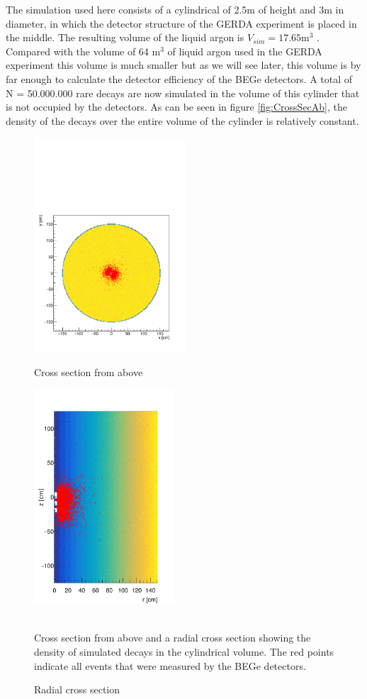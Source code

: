 The simulation used here consists of a cylindrical of 2.5m of height and 3m in diameter, in which the detector structure of the GERDA experiment is placed in the middle.
The resulting volume of the liquid argon is $V_{sim} = 17.65 \mathrm{m}^3$ .
Compared with the volume of 64 m\(^3\) of liquid argon used in the GERDA experiment this volume is much smaller but as we will see later, this volume is by far enough to calculate the detector efficiency of the BEGe detectors.
A total of N = 50.000.000 rare  decays are now simulated in the volume of this cylinder that is not occupied by the detectors. 
As can be seen in figure \ref{fig:CrossSecAb}, the density of the decays over the entire volume of the cylinder is relatively constant.
\\

\begin{figure}[t!]
	\centering
	\begin{minipage}{.5\textwidth}
		\centering
		\includegraphics[height=80mm]{./Bilder/MC-Querschnitt-BEGes.pdf}
		\caption{Cross section from above}
		\label{fig:CrossSecAb}
	\end{minipage}%
	\begin{minipage}{.5\textwidth}
		\centering
		\includegraphics[height=80mm]{./Bilder/MC-Radius-BEGes.png}
		\caption{Radial cross section}
		\label{fig:CrossSecRa}
	\end{minipage}
    \\
	\vspace{0.5cm}
    Cross section from above and a radial cross section showing the density of simulated decays in the cylindrical volume. The red points indicate all events that were measured by the BEGe detectors.
\vspace{0.5cm}
\end{figure}
